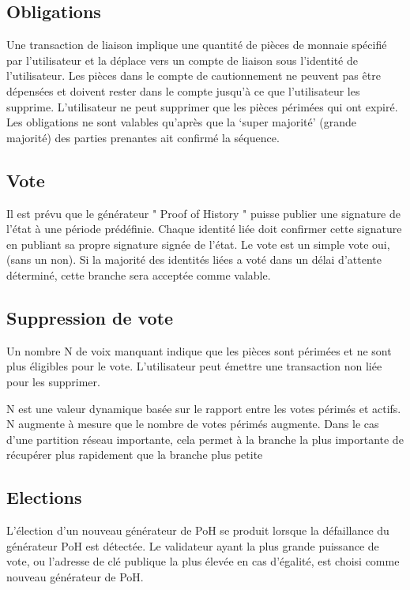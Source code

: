 \documentclass[12pt]{article}
\begin{document}
\subsection{Obligations}
Une transaction de liaison implique une quantité de pièces de monnaie spécifié par l'utilisateur et la déplace vers un compte de liaison sous l'identité de l'utilisateur. Les pièces dans le compte de cautionnement ne peuvent pas être dépensées et doivent rester dans le compte jusqu'à ce que l'utilisateur les supprime. L'utilisateur ne peut supprimer que les pièces périmées qui ont expiré. Les obligations ne sont valables qu’après que la ‘super majorité’ (grande majorité) des parties prenantes ait confirmé la séquence.

\subsection{Vote}
Il est prévu que le générateur " Proof of History " puisse publier une signature de l'état à une période prédéfinie. Chaque identité liée doit confirmer cette signature en publiant sa propre signature signée de l'état. Le vote est un simple vote oui, (sans un non).  Si la majorité des identités liées a voté dans un délai d’attente déterminé, cette branche sera acceptée comme valable.

\subsection{Suppression de vote}

Un nombre N de voix manquant indique que les pièces sont périmées et ne sont plus éligibles pour le vote. L'utilisateur peut émettre une transaction non liée pour les supprimer.

N est une valeur dynamique basée sur le rapport entre les votes périmés et actifs. N augmente à mesure que le nombre de votes périmés augmente. Dans le cas d'une partition réseau importante, cela permet à la branche la plus importante de récupérer plus rapidement que la branche plus petite

\subsection{Elections}\label{subsec:elections}
L'élection d'un nouveau générateur de PoH se produit lorsque la défaillance du générateur PoH est détectée. Le validateur ayant la plus grande puissance de vote, ou l'adresse de clé publique la plus élevée en cas d'égalité, est choisi comme nouveau générateur de PoH.
\end{document}

